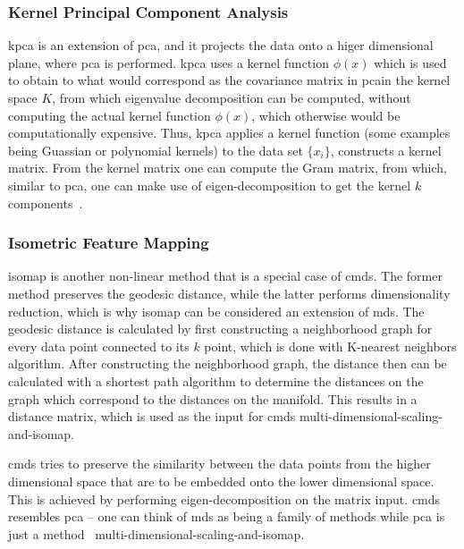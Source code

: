 

\subsubsection{Kernel Principal Component Analysis}\label{subsubsec:kernel-principal-component-analysis}
\gls{kpca} is an extension of \gls{pca}, and it projects the data onto a higer dimensional plane, where \gls{pca} is performed. \gls{kpca} uses a kernel function $\phi (x)$ which is used to obtain to what would correspond as the covariance matrix in \gls{pca}in the kernel space $K$, from which eigenvalue decomposition can be computed, without computing the actual kernel function $\phi (x)$, which otherwise would be computationally expensive. Thus, \gls{kpca} applies a kernel function (some examples being Guassian or polynomial kernels) to the data set $ \{x_{i} \}$, constructs a kernel matrix. From the kernel matrix one can compute the Gram matrix, from which, similar to \gls{pca}, one can make use of eigen-decomposition to get the kernel $k$ components~\cite{kernel-pca}.


\subsubsection{Isometric Feature Mapping}\label{subsubsec:isometric-feature-mapping}
\gls{isomap} is another non-linear method that is a special case of \gls{cmds}. The former method preserves the geodesic distance, while the latter performs dimensionality reduction, which is why \gls{isomap} can be considered an extension of \gls{mds}. The geodesic distance is calculated by first constructing a neighborhood graph for every data point connected to its $k$ point, which is done with K-nearest neighbors algorithm. After constructing the neighborhood graph, the distance then can be calculated with a shortest path algorithm to determine the distances on the graph which correspond to the distances on the manifold. This results in a distance matrix, which is used as the input for \gls{cmds} multi-dimensional-scaling-and-isomap.

\gls{cmds} tries to preserve the similarity between the data points from the higher dimensional space that are to be embedded onto the lower dimensional space. This is achieved by performing eigen-decomposition on the matrix input. \gls{cmds} resembles \gls{pca} -- one can think of \gls{mds} as being a family of methods while \gls{pca} is just a method~\cite{difference-between-pca-and-mds} multi-dimensional-scaling-and-isomap.

